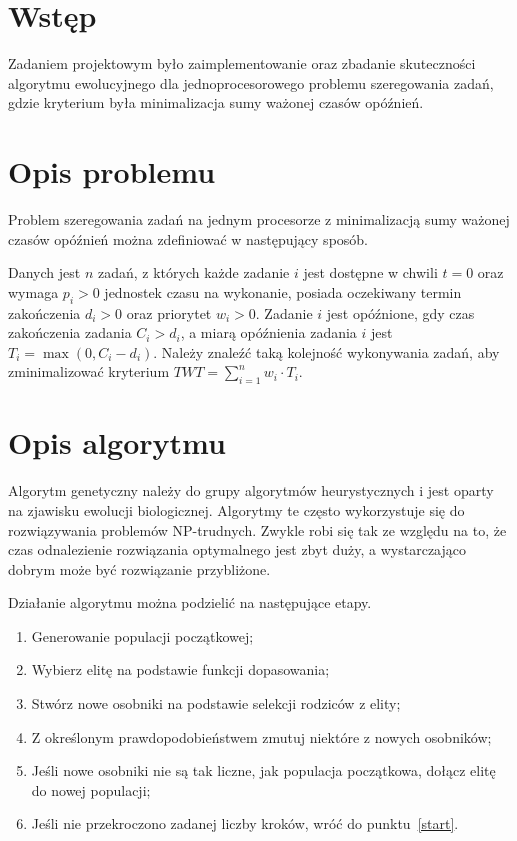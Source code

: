 \section{Wstęp} %
  \label{sec:wstep}

  Zadaniem projektowym było zaimplementowanie oraz zbadanie skuteczności
  algorytmu ewolucyjnego dla jednoprocesorowego problemu szeregowania zadań,
  gdzie kryterium była minimalizacja sumy ważonej czasów opóźnień.


\section{Opis problemu} %
  \label{sec:problem}

  Problem szeregowania zadań na jednym procesorze z minimalizacją sumy ważonej
  czasów opóźnień można zdefiniować w następujący sposób.
  \vspace{1em}

  Danych jest $n$ zadań, z których każde zadanie $i$ jest dostępne w chwili $t=0$
  oraz wymaga $p_i > 0$ jednostek czasu na wykonanie, posiada oczekiwany termin
  zakończenia $d_i > 0$ oraz priorytet $w_i > 0$. Zadanie $i$ jest opóźnione,
  gdy czas zakończenia zadania $C_i > d_i$, a miarą opóźnienia zadania $i$
  jest $T_i = \max(0, C_i - d_i)$. Należy znaleźć taką kolejność wykonywania
  zadań, aby zminimalizować kryterium $TWT = \sum_{i = 1}^{n} w_i \cdot T_i$.


\section{Opis algorytmu} %
  \label{sec:algorytm}

  Algorytm genetyczny należy do grupy algorytmów heurystycznych i jest oparty
  na zjawisku ewolucji biologicznej. Algorytmy te często wykorzystuje się do
  rozwiązywania problemów NP-trudnych. Zwykle robi się tak ze względu na to, że
  czas odnalezienie rozwiązania optymalnego jest zbyt duży, a wystarczająco
  dobrym może być rozwiązanie przybliżone.
  \vspace{1em}

  Działanie algorytmu można podzielić na następujące etapy.
  \begin{enumerate}
    \item Generowanie populacji początkowej;
    \item \label{start} Wybierz elitę na podstawie funkcji dopasowania;
    \item Stwórz nowe osobniki na podstawie selekcji rodziców z elity;
    \item Z określonym prawdopodobieństwem zmutuj niektóre z nowych osobników;
    \item Jeśli nowe osobniki nie są tak liczne, jak populacja początkowa,
          dołącz elitę do nowej populacji;
    \item Jeśli nie przekroczono zadanej liczby kroków, wróć do
          punktu~\ref{start}.
  \end{enumerate}
  \vspace{1em}

